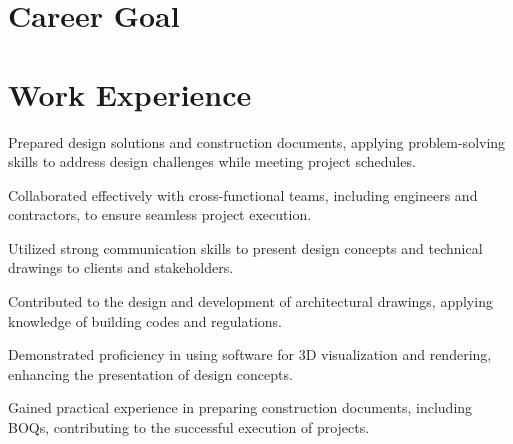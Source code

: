 \begin{minipage}[t]{0.63\textwidth}
    \section{Career Goal} 
      \betweensummaryPointsionVSpace
    \sectionsep

  \section{Work Experience}
    \summaryPoints{ }
    
    \vspace{15pt} %
    
    \begin{tightemize}
      \item Prepared design solutions and construction documents, applying problem-solving skills to address design challenges while meeting project schedules.
      \item Collaborated effectively with cross-functional teams, including engineers and contractors, to ensure seamless project execution.
      \item Utilized strong communication skills to present design concepts and technical drawings to clients and stakeholders.
      
    \end{tightemize}
  \sectionsep

    
    \vspace{5pt}
    \begin{tightemize}
      \item Contributed to the design and development of architectural drawings, applying knowledge of building codes and regulations.
      \item Demonstrated proficiency in using software for 3D visualization and rendering, enhancing the presentation of design concepts.
      \item Gained practical experience in preparing construction documents, including BOQs, contributing to the successful execution of projects.
      

\end{tightemize}
\end{minipage}
